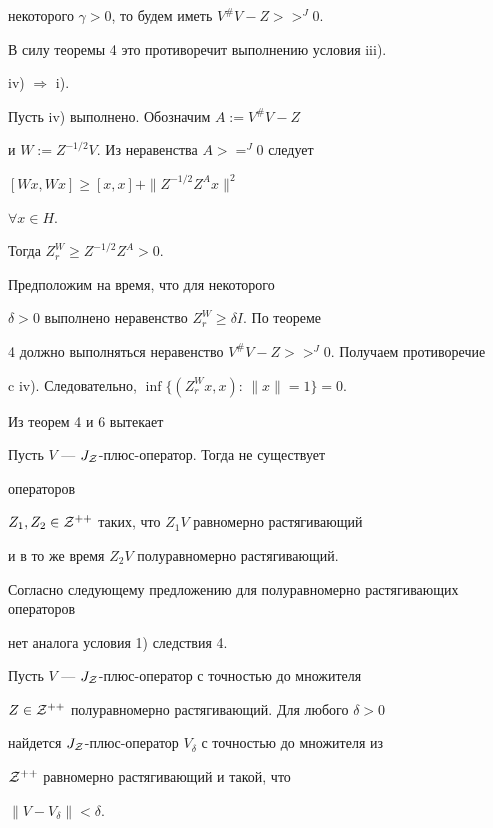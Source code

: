 \begin{pf}
некоторого $\gamma >0$, то будем иметь $V^{\#}V-Z>>^{J}0$.


В силу теоремы 4 это противоречит выполнению условия iii).





iv) $\Rightarrow$ i).


Пусть iv) выполнено. Обозначим $A:=V^{\#}V-Z$


и $W:=Z^{-1/2}V$. Из неравенства $A>=^{J}0$ следует


$[Wx,Wx]\geq [x,x]+\| Z^{-1/2}Z^{A}x\|^{2}$


$\forall x\in H$.


Тогда $Z_{r}^{W}\geq Z^{-1/2}Z^{A}>0$. 


Предположим на время, что для некоторого


$\delta >0$ выполнено неравенство $Z_{r}^{W}\geq \delta I$. По теореме


4 должно выполняться неравенство $V^{\#}V-Z>>^{J}0$. Получаем противоречие 


c iv). Следовательно, $\inf\{(Z^{W}_{r}x,x):\,\| x\| =1\}=0$.


\end{pf}





Из теорем 4 и 6 вытекает





\begin{cor}


Пусть $V$ --- $J_{\cal Z}$-плюс-оператор. Тогда не существует


операторов


$Z_{1},Z_{2}\in {\cal Z}^{++}$ таких, что $Z_{1}V$ равномерно растягивающий


и в то же время $Z_{2}V$ полуравномерно растягивающий.


\end{cor}





Согласно следующему предложению для полуравномерно растягивающих операторов 


нет аналога условия 1) следствия 4.





\begin{prop}


Пусть $V$ --- $J_{\cal Z}$-плюс-оператор с точностью до множителя


$Z\in {\cal Z}^{++}$ полуравномерно растягивающий. Для любого $\delta >0$


найдется $J_{\cal Z}$-плюс-оператор $V_{\delta}$ с точностью до множителя из


${\cal Z}^{++}$ равномерно растягивающий и такой, что


$\| V-V_{\delta}\|<\delta$.


\end{prop}





